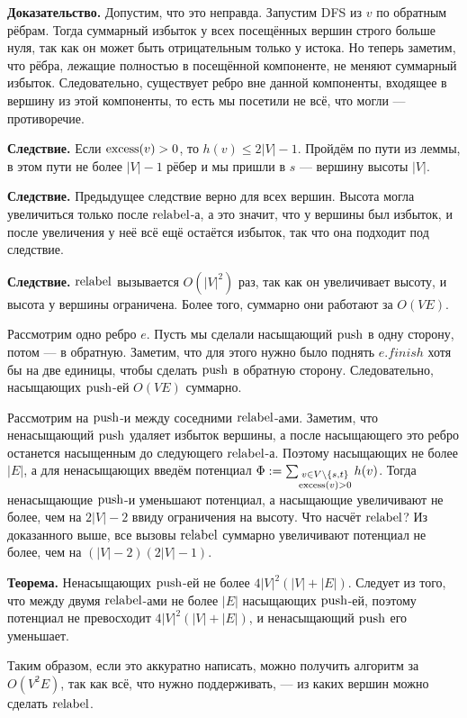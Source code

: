 \textbf{Доказательство.} Допустим, что это неправда. Запустим DFS из $v$ по обратным рёбрам. Тогда суммарный избыток у всех посещённых вершин строго больше нуля, так как он может быть отрицательным только у истока.
Но теперь заметим, что рёбра, лежащие полностью в посещённой компоненте, не меняют суммарный избыток.
Следовательно, существует ребро вне данной компоненты, входящее в вершину из этой компоненты, то есть мы посетили не всё, что могли --- противоречие.

\textbf{Следствие.} Если $\operatorname{excess}(v) > 0$, то $h(v) \le 2|V| - 1$. Пройдём по пути из леммы, в этом пути не более $|V| - 1$ рёбер и мы пришли в $s$ --- вершину высоты $|V|$.

\textbf{Следствие.} Предыдущее следствие верно для всех вершин. Высота могла увеличиться только после $\operatorname{relabel}$-а, а это значит, что у вершины был избыток, и после увеличения у неё всё ещё остаётся избыток, так что она подходит под следствие.

\textbf{Следствие.} $\operatorname{relabel}$ вызывается $O(|V|^2)$ раз, так как он увеличивает высоту, и высота у вершины ограничена.
Более того, суммарно они работают за $O(VE)$.

Рассмотрим одно ребро $e$. Пусть мы сделали насыщающий $\operatorname{push}$ в одну сторону, потом --- в обратную.
Заметим, что для этого нужно было поднять $e.finish$ хотя бы на две единицы, чтобы сделать $\operatorname{push}$ в обратную сторону.
Следовательно, насыщающих $\operatorname{push}$-ей $O(VE)$ суммарно.

Рассмотрим на $\operatorname{push}$-и между соседними $\operatorname{relabel}$-ами. Заметим, что ненасыщающий $\operatorname{push}$ удаляет избыток вершины, а после насыщающего это ребро останется насыщенным до следующего $\operatorname{relabel}$-а.
Поэтому насыщающих не более $|E|$, а для ненасыщающих введём потенциал $\Phi := \sum_{\substack{v \in V \setminus \{s, t\}\\ \operatorname{excess}(v) > 0}} h(v)$.
Тогда ненасыщающие $\operatorname{push}$-и уменьшают потенциал, а насыщающие увеличивают не более, чем на $2|V| - 2$ ввиду ограничения на высоту.
Что насчёт $\operatorname{relabel}$? Из доказанного выше, все вызовы $\operatorname{relabel}$ суммарно увеличивают потенциал не более, чем на $(|V| - 2)(2|V| - 1)$.

\textbf{Теорема.} Ненасыщающих $\operatorname{push}$-ей не более $4|V|^2(|V| + |E|)$. Следует из того, что между двумя $\operatorname{relabel}$-ами не более $|E|$ насыщающих $\operatorname{push}$-ей, поэтому потенциал не превосходит $4|V|^2(|V| + |E|)$, и ненасыщающий $\operatorname{push}$ его уменьшает.

Таким образом, если это аккуратно написать, можно получить алгоритм за $O(V^2E)$, так как всё, что нужно поддерживать, --- из каких вершин можно сделать $\operatorname{relabel}$.

